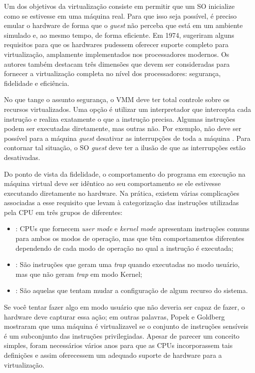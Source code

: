 Um dos objetivos da virtualização consiste em permitir que um SO inicialize
como se estivesse em uma máquina real. Para que isso seja possível, é preciso
emular o hardware de forma que o \emph{guest} não perceba que está em um
ambiente simulado e, ao mesmo tempo, de forma
eficiente. Em 1974, \citet{popek} sugeriram alguns requisitos para que os
hardwares pudessem oferecer suporte completo para virtualização,
amplamente implementados nos processadores modernos. Os autores também
destacam três dimensões que devem ser consideradas para fornecer a
virtualização completa no nível dos processadores: segurança, fidelidade e
eficiência.

No que tange o assunto segurança, o VMM deve ter total controle sobre os
recursos virtualizados. Uma opção é utilizar um interpretador que intercepta
cada instrução e realiza exatamente o que a instrução precisa. Algumas
instruções podem ser executadas diretamente, mas outras não. Por exemplo, não
deve ser possível para a máquina \emph{guest} desativar as interrupções de toda
a máquina \citep{tanenbaum}. Para contornar tal situação, o SO \emph{guest}
deve ter a ilusão de que as interrupções estão desativadas.

Do ponto de vista da fidelidade, o comportamento do programa em execução na
máquina virtual deve ser idêntico ao seu comportamento se ele estivesse executando
diretamente no hardware. Na prática, existem várias complicações associadas a
esse requisito que levam à categorização das instruções utilizadas pela CPU em
três grupos de diferentes:

\begin{itemize}
  \item {}: CPUs que fornecem \emph{user mode} e
        \emph{kernel mode} apresentam instruções comuns para ambos os modos de
        operação, mas que têm comportamentos diferentes dependendo de cada modo
        de operação no qual a instrução é executada;
  \item {}: São instruções que geram uma
        \emph{trap} quando executadas no modo usuário, mas que não geram
        \emph{trap} em modo Kernel;
  \item {}: São aquelas que
        tentam mudar a configuração de algum recurso do sistema.
\end{itemize}

Se você tentar fazer algo em modo usuário que não deveria ser capaz de
fazer, o hardware deve capturar essa ação; em outras palavras, Popek e Goldberg
mostraram que uma máquina é virtualizavel se o conjunto de instruções sensíveis
é um subconjunto das instruções privilegiadas. Apesar de parecer um conceito
simples, foram necessários vários anos para que as CPUs incorporassem tais definições
e assim oferecessem um adequado suporte de hardware para a virtualização.

